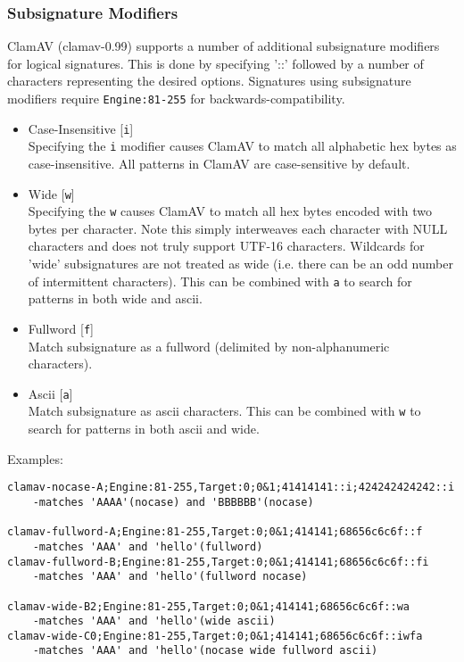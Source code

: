 \documentclass[a4paper,titlepage,12pt]{article}
\begin{document}
    \subsubsection{Subsignature Modifiers}
    ClamAV (clamav-0.99) supports a number of additional subsignature modifiers
    for logical signatures. This is done by specifying '::' followed by a number
    of characters representing the desired options. Signatures using subsignature
    modifiers require \verb+Engine:81-255+ for backwards-compatibility.
    \begin{itemize}
    \item Case-Insensitive [\verb+i+]\\
      Specifying the \verb+i+ modifier causes ClamAV to match all alphabetic
      hex bytes as case-insensitive. All patterns in ClamAV are case-sensitive
      by default.
    \item Wide [\verb+w+]\\
      Specifying the \verb+w+ causes ClamAV to match all hex bytes encoded with
      two bytes per character. Note this simply interweaves each character with
      NULL characters and does not truly support UTF-16 characters. Wildcards for
      'wide' subsignatures are not treated as wide (i.e. there can be an odd number
      of intermittent characters). This can be combined with \verb+a+ to search for
      patterns in both wide and ascii.
    \item Fullword [\verb+f+]\\
      Match subsignature as a fullword (delimited by non-alphanumeric characters).
    \item Ascii [\verb+a+]\\
      Match subsignature as ascii characters. This can be combined with \verb+w+
      to search for patterns in both ascii and wide.
    \end{itemize}
    Examples:
    \begin{verbatim}
clamav-nocase-A;Engine:81-255,Target:0;0&1;41414141::i;424242424242::i
    -matches 'AAAA'(nocase) and 'BBBBBB'(nocase)

clamav-fullword-A;Engine:81-255,Target:0;0&1;414141;68656c6c6f::f
    -matches 'AAA' and 'hello'(fullword)
clamav-fullword-B;Engine:81-255,Target:0;0&1;414141;68656c6c6f::fi
    -matches 'AAA' and 'hello'(fullword nocase)

clamav-wide-B2;Engine:81-255,Target:0;0&1;414141;68656c6c6f::wa
    -matches 'AAA' and 'hello'(wide ascii)
clamav-wide-C0;Engine:81-255,Target:0;0&1;414141;68656c6c6f::iwfa
    -matches 'AAA' and 'hello'(nocase wide fullword ascii)
    \end{verbatim}
\end{document}
